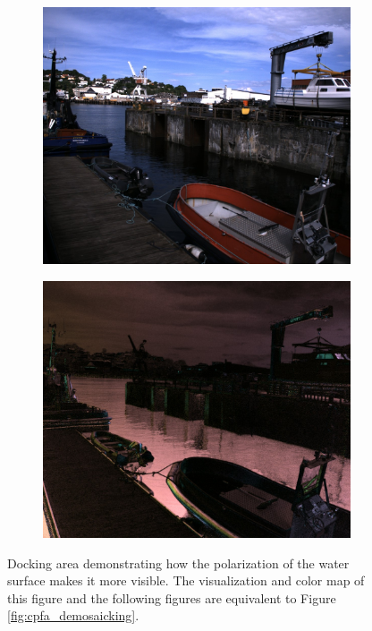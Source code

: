 \begin{figure}[H]
    \begin{subfigure}[T]{.49\textwidth}
        \includegraphics[width=\textwidth]{figures/pictures/img_2790_s0.jpg}
    \end{subfigure} \hfill
    \begin{subfigure}[T]{.49\textwidth}
        \includegraphics[width=\textwidth]{figures/pictures/img_2790_pol.jpg}
    \end{subfigure}
    \caption{Docking area demonstrating how the polarization of the water surface makes it more visible. 
    The visualization and color map of this figure and the following figures are equivalent to Figure \ref{fig:cpfa_demosaicking}.}
\end{figure}
\vspace{-.7cm}


